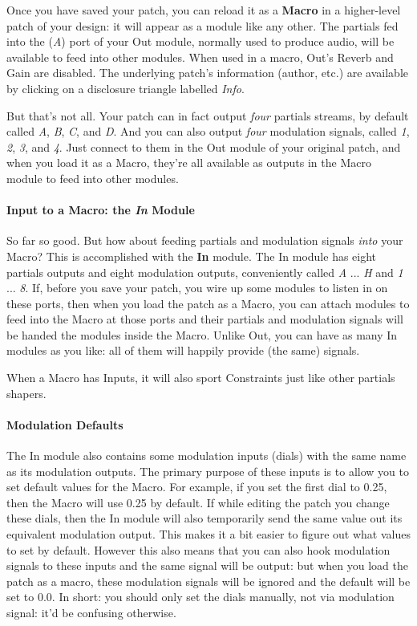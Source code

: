 \documentclass{article}
\begin{document}
Once you have saved your patch, you can reload it as a {\bf Macro} in a higher-level patch of your design: it will appear as a module like any other.  The partials fed into the ({\it A}) port of your Out module, normally used to produce audio, will be available to feed into other modules. When used in a macro, Out's Reverb and Gain are disabled.  The underlying patch's information (author, etc.) are available by clicking on a disclosure triangle labelled {\it Info}.  

But that's not all.  Your patch can in fact output {\it four} partials streams, by default called {\it A}, {\it B}, {\it C}, and {\it D}.  And you can also output {\it four} modulation signals, called {\it 1}, {\it 2}, {\it 3}, and {\it 4}.  Just connect to them in the Out module of your original patch, and when you load it as a Macro, they're all available as outputs in the Macro module to feed into other modules.


\paragraph{Input to a Macro: the \textit{In} Module}  So far so good.  But how about feeding partials and modulation signals {\it into} your Macro?  This is accomplished with the {\bf In} module.  The In module has eight partials outputs and eight modulation outputs, conveniently called {\it A} ... {\it H} and {\it 1} ... {\it 8}.  If, before you save your patch, you wire up some modules to listen in on these ports, then when you load the patch as a Macro, you can attach modules to feed into the Macro at those ports and their partials and modulation signals will be handed the modules inside the Macro.  Unlike Out, you can have as many In modules as you like: all of them will happily provide (the same) signals.

When a Macro has Inputs, it will also sport Constraints just like other partials shapers.

\paragraph{Modulation Defaults}

The In module also contains some modulation inputs (dials) with the same name as its modulation outputs.  The primary purpose of these inputs is to allow you to set default values for the Macro.   For example, if you set the first dial to 0.25, then the Macro will use 0.25 by default.  If while editing the patch you change these dials, then the In module will also temporarily send the same value out its equivalent modulation output.  This makes it a bit easier to figure out what values to set by default.  However this also means that you can also hook modulation signals to these inputs and the same signal will be output: but when you load the patch as a macro, these modulation signals will be ignored and the default will be set to 0.0.  In short: you should only set the dials manually, not via modulation signal: it'd be confusing otherwise.
\end{document}
